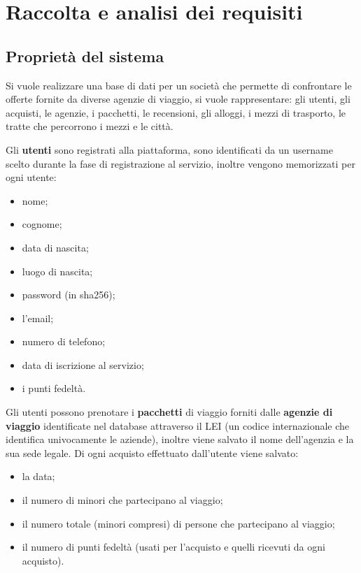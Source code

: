 \section{Raccolta e analisi dei requisiti}
\subsection{Proprietà del sistema}
%
%
Si vuole realizzare una base di dati per un società che permette di confrontare le offerte fornite da diverse agenzie di viaggio, si vuole rappresentare: gli utenti, gli acquisti, le agenzie, i pacchetti, le recensioni, gli alloggi, i mezzi di trasporto, le tratte che percorrono i mezzi e le città.

%
%
Gli \textbf{utenti} sono registrati alla piattaforma, sono identificati da un username scelto durante la fase di registrazione al servizio, inoltre vengono memorizzati per ogni utente:
\begin{multicols}{2}
\begin{itemize}
    \item nome;
    \item cognome;
    \item data di nascita;
    \item luogo di nascita;
    \item password (in sha256);
    \item l'email;
    \item numero di telefono;
    \item data di iscrizione al servizio;
    \item i punti fedeltà.
\end{itemize}
\end{multicols}
%
%
Gli utenti possono prenotare i \textbf{pacchetti} di viaggio forniti dalle \textbf{agenzie di viaggio} identificate nel database attraverso il LEI (un codice internazionale che identifica univocamente le aziende), inoltre viene salvato il nome dell'agenzia e la sua sede legale. Di ogni acquisto effettuato dall'utente viene salvato:
\begin{multicols}{2}
    \begin{itemize}
        \item la data;
        \item il numero di minori che partecipano al viaggio;
        \item il numero totale (minori compresi) di persone che partecipano al viaggio;
        \item il numero di punti fedeltà (usati per l'acquisto e quelli ricevuti da ogni acquisto).
     \end{itemize}
 \end{multicols}
